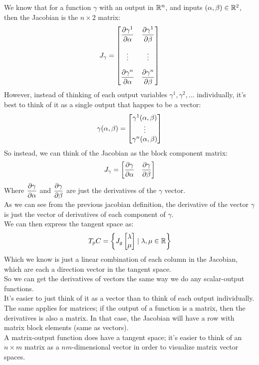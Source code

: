 \documentclass[12pt]{article}
\begin{document}
We know that for a function $\gamma$
with an output in $\mathbb{R}^n$,
and inputs $(\alpha, \beta) \in \mathbb{R}^2$,
then the Jacobian is the $n \times 2$ matrix:
\[ J_\gamma = \begin{bmatrix}
{\partialdd{\gamma^1}{\alpha}} & 
{\partialdd{\gamma^1}{\beta}} \vspace{10pt} \\
{\vdots} & {\vdots} \vspace{10pt} \\
{\partialdd{\gamma^n}{\alpha}} & 
{\partialdd{\gamma^n}{\beta}}
\end{bmatrix} \]
However, instead of thinking of each
output variables $\gamma^1, \gamma^2, \dots$
individually, it's best to think of it
as a single output that happes to be a vector:
\[ \gamma(\alpha, \beta) = 
\begin{bmatrix} \gamma^1(\alpha, \beta) \\ \vdots \\ \gamma^n (\alpha, \beta) \end{bmatrix} \]
So instead, we can think of the Jacobian
as the block component matrix:
\[ J_\gamma = \begin{bmatrix} \dfrac{\partial \gamma}{\partial \alpha} & \dfrac{\partial \gamma}{\partial \beta} \end{bmatrix} \]
Where $\dfrac{\partial \gamma}{\partial \alpha}$
and $\dfrac{\partial \gamma}{\partial \beta}$
are just the derivatives of the $\gamma$ vector. \\
As we can see from the previous jacobian definition,
the derivative of the vector $\gamma$
is just the vector of derivatives of each component
of $\gamma$. \\

We can then express the tangent space as:
\[ T_pC = \left\{  
J_g \begin{bmatrix} \lambda \\ \mu \end{bmatrix}
\mid \lambda, \mu \in \mathbb{R}  \right\} \]
Which we know is just a linear combination of each
column in the Jacobian, which are each
a direction vector in the tangent space. \\

So we can get the derivatives of vectors
the same way we do any scalar-output functions. \\
It's easier to just think of it as a vector
than to think of each output individually. \\

The same applies for matrices;
if the output of a function is a matrix,
then the derivatives is also a matrix. 
In that case, the Jacobian will have a row
with matrix block elements (same as vectors). \\
A matrix-output function does have a tangent space;
it's easier to think of an $n \times m$ matrix
as a $nm$-dimensional vector in order to visualize
matrix vector spaces. \\
\end{document}
